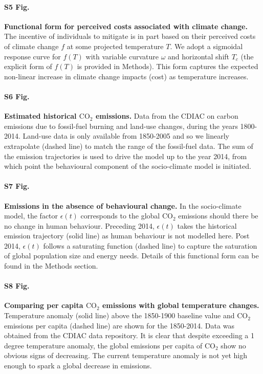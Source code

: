 \documentclass[10pt,letterpaper]{article}
\begin{document}
\paragraph*{S5 Fig.}
\label{S5_fig}
\textbf{Functional form for perceived costs associated with climate change.} The incentive of individuals to mitigate is in part based on their perceived costs of climate change $f$ at some projected temperature $T$. We adopt a sigmoidal response curve for $f(T)$ with variable curvature $\omega$ and horizontal shift $T_c$ (the explicit form of $f(T)$ is provided in Methods). This form captures the expected non-linear increase in climate change impacts (cost) as temperature increases.

\paragraph*{S6 Fig.}
\label{S6_fig}
\textbf{Estimated historical $\text{CO}_2$ emissions.} Data from the CDIAC on carbon emissions due to fossil-fuel burning and land-use changes, during the years 1800-2014. Land-use data is only available from 1850-2005 and so we linearly extrapolate (dashed line) to match the range of the fossil-fuel data. The sum of the emission trajectories is used to drive the model up to the year 2014, from which point the behavioural component of the socio-climate model is initiated.

\paragraph*{S7 Fig.}
\label{S7_fig}
\textbf{Emissions in the absence of behavioural change.} In the socio-climate model, the factor $\epsilon(t)$ corresponds to the global $\text{CO}_2$ emissions should there be no change in human behaviour. Preceding 2014, $\epsilon(t)$ takes the historical emission trajectory (solid line) as human behaviour is not modelled here. Post 2014, $\epsilon(t)$ follows a saturating function (dashed line) to capture the saturation of global population size and energy needs. Details of this functional form can be found in the Methods section.

\paragraph*{S8 Fig.}
\label{S8_fig}
\textbf{Comparing per capita $\text{CO}_2$ emissions with global temperature changes.} Temperature anomaly (solid line) above the 1850-1900 baseline value and $\text{CO}_2$ emissions per capita (dashed line) are shown for the 1850-2014. Data was obtained from the CDIAC data repository\cite{boden17}. It is clear that despite exceeding a 1 degree temperature anomaly, the global emissions per capita of $\text{CO}_2$ show no obvious signs of decreasing. The current temperature anomaly is not yet high enough to spark a global decrease in emissions.
\end{document}
